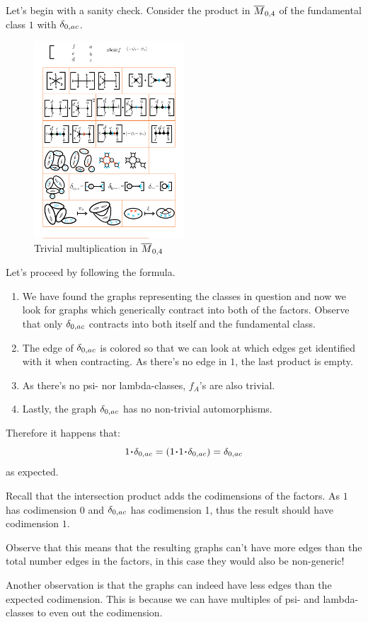 \documentclass[12pt]{memoir}
\begin{document}
\begin{Ex}
    Let's begin with a sanity check. Consider the product in $\overline M_{0,4}$ of the fundamental class $1$ with $\delta_{0,{ac}}$. 
    \begin{figure}[h!]
        \centering
        \includegraphics[width=0.5\textwidth, trim= 13cm 21.5cm 1.5cm 4.5cm,clip]{../figs/FigsDNnotability1.pdf}
        \caption{Trivial multiplication in $\overline M_{0,4}$}
        \label{fig:trivial-multiplication-M04}
    \end{figure} 
    Let's proceed by following the formula.
    \begin{enumerate}
        \item We have found the graphs representing the classes in question and now we look for graphs which generically contract into both of the factors. Observe that only $\delta_{0,{ac}}$ contracts into both itself and the fundamental class.
        \item The edge of $\delta_{0,{ac}}$ is colored so that we can look at which edges get identified with it when contracting. As there's no edge in $1$, the last product is empty.
        \item As there's no psi- nor lambda-classes, $f_A$'s are also trivial.
        \item Lastly, the graph $\delta_{0,{ac}}$ has no non-trivial automorphisms.
    \end{enumerate}
    Therefore it happens that:
    $$1\.\dl_{0,{ac}}=\left(1\.1\.\dl_{0,{ac}}\right)=\dl_{0,{ac}}$$
    as expected.
\end{Ex}

\begin{Rmk}
    Recall that the intersection product adds the codimensions of the factors. As $1$ has codimension $0$ and $\delta_{0,{ac}}$ has codimension 1, thus the result should have codimension $1$.\par
    Observe that this means that the resulting graphs can't have more edges than the total number edges in the factors, in this case they would also be non-generic!\par
    Another observation is that the graphs can indeed have less edges than the expected codimension. This is because we can have multiples of psi- and lambda-classes to even out the codimension.
\end{Rmk}
\end{document}
